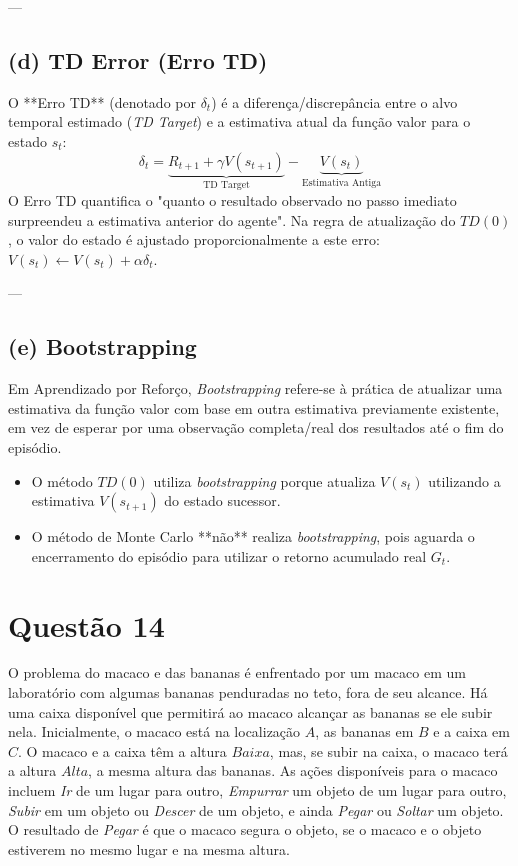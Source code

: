 \documentclass[a4paper,12pt]{article}
\begin{document}
---

\subsection*{(d) TD Error (Erro TD)}
O **Erro TD** (denotado por $\delta_t$) é a diferença/discrepância entre o alvo temporal estimado (\textit{TD Target}) e a estimativa atual da função valor para o estado $s_t$:
\begin{equation}
	\delta_t = \underbrace{R_{t+1} + \gamma V(s_{t+1})}_{\text{TD Target}} - \underbrace{V(s_t)}_{\text{Estimativa Antiga}}
\end{equation}
O Erro TD quantifica o "quanto o resultado observado no passo imediato surpreendeu a estimativa anterior do agente". Na regra de atualização do $TD(0)$, o valor do estado é ajustado proporcionalmente a este erro: $V(s_t) \leftarrow V(s_t) + \alpha \delta_t$.

---

\subsection*{(e) Bootstrapping}
Em Aprendizado por Reforço, \textit{Bootstrapping} refere-se à prática de atualizar uma estimativa da função valor com base em outra estimativa previamente existente, em vez de esperar por uma observação completa/real dos resultados até o fim do episódio.
\begin{itemize}
\item O método $TD(0)$ utiliza \textit{bootstrapping} porque atualiza $V(s_t)$ utilizando a estimativa $V(s_{t+1})$ do estado sucessor.
\item O método de Monte Carlo **não** realiza \textit{bootstrapping}, pois aguarda o encerramento do episódio para utilizar o retorno acumulado real $G_t$.
\end{itemize}


\section*{Questão 14}


O problema do macaco e das bananas é enfrentado por um macaco em um laboratório com algumas bananas penduradas no teto, fora de seu alcance. Há uma caixa disponível que permitirá ao macaco alcançar as bananas se ele subir nela.
Inicialmente, o macaco está na localização $A$, as bananas em $B$ e a caixa em $C$. O macaco e a caixa têm a altura $Baixa$, mas, se subir na caixa, o macaco terá a altura $Alta$, a mesma altura das bananas. As ações disponíveis para o macaco incluem \textit{Ir} de um lugar para outro, \textit{Empurrar} um objeto de um lugar para outro, \textit{Subir} em um objeto ou \textit{Descer} de um objeto, e ainda \textit{Pegar} ou \textit{Soltar} um objeto. O resultado de \textit{Pegar} é que o macaco segura o objeto, se o macaco e o objeto estiverem no mesmo lugar e na mesma altura.
\end{document}
